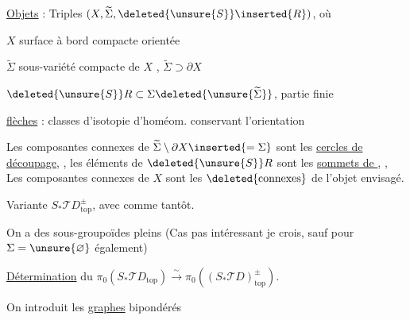 \uline{Objets} : Triples $(X,\widetilde\Sigma,
\deleted{\unsure{S}}\inserted{R})$, où

$X$ surface à bord compacte orientée

$\widetilde\Sigma$ sous-variété compacte de $X$
, $\widetilde\Sigma\supset\partial X$

$\deleted{\unsure{S}}R\subset\Sigma\deleted{\unsure{\widetilde\Sigma}}$,
partie finie


\uline{flèches} : classes d'isotopie d'homéom. conservant l'orientation

Les composantes connexes de $\widetilde\Sigma\setminus\partial X
\inserted{=\Sigma}$ sont les \uline{cercles de découpage},
,
les éléments de $\deleted{\unsure{S}}R$ sont les
 \uline{sommets de
},
,
Les composantes connexes de $X$ sont les
$\deleted{\text{connexes}}$
de l'objet envisagé.

Variante $S_*\mathcal TD_{\mathrm{top}}^\pm$, avec
comme tantôt.

On a des sous-groupoïdes pleins
(Cas pas intéressant je crois, sauf pour $\Sigma=\unsure{\varnothing}$
également)


 \uline{Détermination} du
$\pi_0(S_*\mathcal TD_{\mathrm{top}})
 \xrightarrow{\sim}\pi_0((S_*\mathcal TD)^\pm_{\mathrm{top}})$.

On introduit les \uline{graphes}  bipondérés
